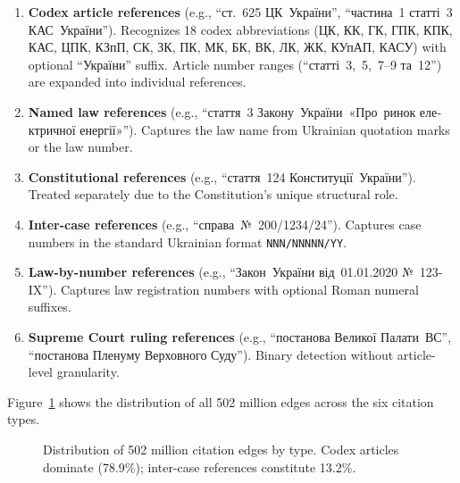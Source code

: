 \documentclass[11pt]{article}
\begin{document}
\begin{enumerate}[leftmargin=*, nosep]
  \item \textbf{Codex article references} (e.g., ``\foreignlanguage{ukrainian}{ст.~625 ЦК~\foreignlanguage{ukrainian}{України}}'', ``\foreignlanguage{ukrainian}{частина~1 статті~3 КАС~\foreignlanguage{ukrainian}{України}}'').
    Recognizes 18 codex abbreviations (\foreignlanguage{ukrainian}{ЦК, КК, ГК, ГПК, КПК, КАС, ЦПК, КЗпП, СК, ЗК, ПК, МК, БК, ВК, ЛК, ЖК, КУпАП, КАСУ}) with optional ``\foreignlanguage{ukrainian}{України}'' suffix.
    Article number ranges (``\foreignlanguage{ukrainian}{статті~3,~5,~7--9 та~12}'') are expanded into individual references.

  \item \textbf{Named law references} (e.g., ``\foreignlanguage{ukrainian}{стаття~3 Закону~\foreignlanguage{ukrainian}{України}~«Про~ринок електричної енергії»}'').
    Captures the law name from Ukrainian quotation marks or the law number.

  \item \textbf{Constitutional references} (e.g., ``\foreignlanguage{ukrainian}{стаття~124 Конституції~\foreignlanguage{ukrainian}{України}}'').
    Treated separately due to the Constitution's unique structural role.

  \item \textbf{Inter-case references} (e.g., ``\foreignlanguage{ukrainian}{справа~№~200/1234/24}'').
    Captures case numbers in the standard Ukrainian format \texttt{NNN/NNNNN/YY}.

  \item \textbf{Law-by-number references} (e.g., ``\foreignlanguage{ukrainian}{Закон~\foreignlanguage{ukrainian}{України} від~01.01.2020 №~123-IX}'').
    Captures law registration numbers with optional Roman numeral suffixes.

  \item \textbf{Supreme Court ruling references} (e.g., ``\foreignlanguage{ukrainian}{постанова Великої Палати~ВС}'', ``\foreignlanguage{ukrainian}{постанова Пленуму Верховного Суду}'').
    Binary detection without article-level granularity.
\end{enumerate}

Figure~\ref{fig:citation-types} shows the distribution of all 502 million edges across the six citation types.

\begin{figure}[t]
\centering

\caption{Distribution of 502 million citation edges by type. Codex articles dominate (78.9\%); inter-case references constitute 13.2\%.}
\label{fig:citation-types}
\end{figure}
\end{document}
